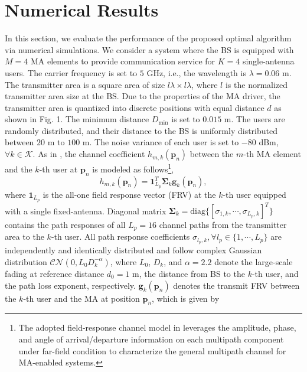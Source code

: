\documentclass[12pt, draftclsnofoot, onecolumn]{IEEEtran}
\begin{document}
\section{Numerical Results}
In this section, we evaluate the performance of the proposed optimal algorithm via numerical simulations. We consider a system where the BS is equipped with $M=4$ MA elements to provide communication service for $K=4$ single-antenna users. The carrier frequency is set to $5$ GHz, i.e., the wavelength is $\lambda=0.06$ m. The transmitter area is a square area of size $l\lambda\times l\lambda$, where $l$ is the normalized transmitter area size at the BS. Due to the properties of the MA driver, the transmitter area is quantized into discrete positions with equal distance $d$ as shown in Fig. 1. The minimum distance $D_{\mathrm{min}}$ is set to $0.015$ m. The users are randomly distributed, and their distance to the BS is uniformly distributed between $20$ m to $100$ m. The noise variance of each user is set to $-80$ dBm, $\forall k \in\mathcal{K}$. As in \cite{ma2022mimo,zhu2022modeling,zhu2023movable}, the channel coefficient $h_{m,k}(\mathbf{p}_n)$ between the $m$-th MA element and the $k$-th user at $\mathbf{p}_n$ is modeled as follows\footnote{The adopted field-response channel model in \cite{ma2022mimo,zhu2022modeling,zhu2023movable} leverages the amplitude, phase, and angle of arrival/departure information on each multipath component under far-field condition to characterize the general multipath channel for MA-enabled systems.},
\begin{equation}
    h_{m,k}(\mathbf{p}_n)=\mathbf{1}_{L_p}^T\bm{\Sigma}_k\mathbf{g}_k(\mathbf{p}_n),
\end{equation}
where $\mathbf{1}_{L_p}$ is the all-one field response vector (FRV) at the $k$-th user equipped with a single fixed-antenna. Diagonal matrix $\bm{\Sigma}_k=\mathrm{diag}\{[\sigma_{1,k},\cdots,\sigma_{L_p,k}]^T\}$ contains the path responses of all $L_p=16$ channel paths from the transmitter area to the $k$-th user. All path response coefficients $\sigma_{l_p,k}, \forall l_p\in\{1,\cdots,L_p\}$ are independently and identically distributed and follow complex Gaussian distribution $\mathcal{CN}(0,L_0D_k^{-\alpha})$, where $L_0$, $D_k$, and $\alpha=2.2$ denote the large-scale fading at reference distance $d_0=1$ m, the distance from BS to the $k$-th user, and the path loss exponent, respectively. $\mathbf{g}_k(\mathbf{p}_n)$ denotes the transmit FRV between the $k$-th user and the MA at position $\mathbf{p}_n$, which is given by \cite{ma2022mimo,zhu2022modeling}
\end{document}
